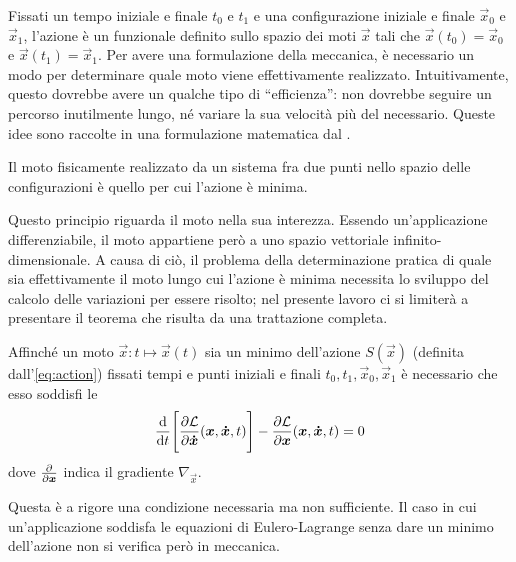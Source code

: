Fissati un tempo iniziale e finale $t_0$ e $t_1$ e una configurazione iniziale e finale $\vec{x}_0$ e $\vec{x}_1$, l'azione è un funzionale definito sullo spazio dei moti $\vec{x}$ tali che $\vec{x}(t_0) = \vec{x}_0$ e $\vec{x}(t_1)=\vec{x}_1$. Per avere una formulazione della meccanica, è necessario un modo per determinare quale moto viene effettivamente realizzato. Intuitivamente, questo dovrebbe avere un qualche tipo di \textquotedblleft efficienza\textquotedblright: non dovrebbe seguire un percorso inutilmente lungo, né variare la sua velocità più del necessario. Queste idee sono raccolte in una formulazione matematica dal .
\begin{minaction}
Il moto fisicamente realizzato da un sistema fra due punti nello spazio delle configurazioni è quello per cui l'azione è minima.
\end{minaction}
Questo principio riguarda il moto nella sua interezza. Essendo un'applicazione differenziabile, il moto appartiene però a uno spazio vettoriale infinito-dimensionale. A causa di ciò, il problema della determinazione pratica di quale sia effettivamente il moto lungo cui l'azione è minima necessita lo sviluppo del calcolo delle variazioni per essere risolto; nel presente lavoro ci si limiterà a presentare il teorema che risulta da una trattazione completa.
\begin{theorem}
  Affinché un moto $\vec{x}: t\mapsto \vec{x}(t)$ sia un minimo dell'azione $S(\vec{x})$ (definita dall'\autoref{eq:action}) fissati tempi e punti iniziali e finali $t_0, t_1, \vec{x}_0, \vec{x}_1$ è necessario che esso soddisfi le  \begin{equation}
    \dv{t}\Bigg[\pdv{\mathcal{L}}{\boldsymbol{\dot{x}}}()(\boldsymbol{x}, \boldsymbol{\dot{x}}, t)\Bigg] - \pdv{\mathcal{L}}{\boldsymbol{x}}()(\boldsymbol{x}, \boldsymbol{\dot{x}}, t) = 0
  \end{equation} 
  dove $\pdv{\boldsymbol{x}}$ indica il gradiente $\nabla_{\vec{x}}$.
\end{theorem}
\begin{remark}
  Questa è a rigore una condizione necessaria ma non sufficiente. Il caso in cui un'applicazione soddisfa le equazioni di Eulero-Lagrange senza dare un minimo dell'azione non si verifica però in meccanica. 
\end{remark}

